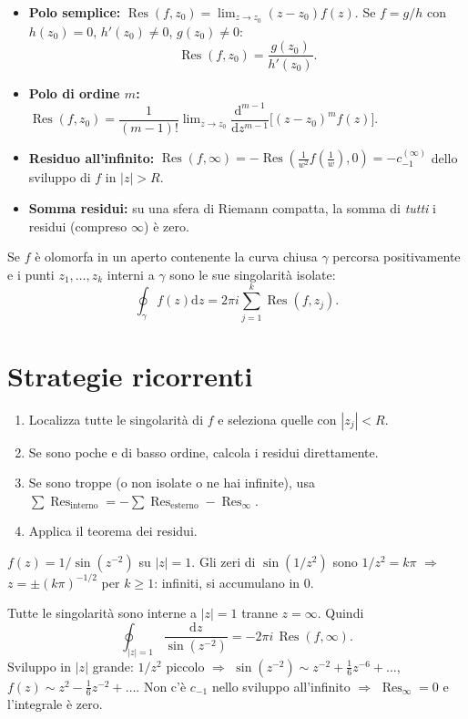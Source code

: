 \documentclass[11pt,a4paper,openany]{book}
\theoremstyle{definition}
\newcommand{\dd}{\mathrm{d}}
\DeclareMathOperator{\Res}{Res}
\begin{document}
\begin{teoria}
\begin{itemize}
\item \textbf{Polo semplice:} $\Res(f,z_0)=\lim_{z\to z_0}(z-z_0)f(z)$. Se $f=g/h$ con $h(z_0)=0$, $h'(z_0)\neq 0$, $g(z_0)\neq 0$:
$$\Res(f,z_0)=\frac{g(z_0)}{h'(z_0)}.$$
\item \textbf{Polo di ordine $m$:} $\Res(f,z_0)=\dfrac{1}{(m-1)!}\lim_{z\to z_0}\dfrac{\dd^{m-1}}{\dd z^{m-1}}\big[(z-z_0)^m f(z)\big]$.
\item \textbf{Residuo all'infinito:} $\Res(f,\infty)=-\Res\!\left(\tfrac{1}{w^2}f(\tfrac 1 w),0\right)=-c_{-1}^{(\infty)}$ dello sviluppo di $f$ in $|z|>R$.
\item \textbf{Somma residui:} su una sfera di Riemann compatta, la somma di \emph{tutti} i residui (compreso $\infty$) \`e zero.
\end{itemize}
\end{teoria}

\begin{teoria}
Se $f$ \`e olomorfa in un aperto contenente la curva chiusa $\gamma$ percorsa positivamente e i punti $z_1,\dots,z_k$ interni a $\gamma$ sono le sue singolarit\`a isolate:
$$\oint_\gamma f(z)\dd z=2\pi i\sum_{j=1}^k\Res(f,z_j).$$
\end{teoria}

\section{Strategie ricorrenti}

\begin{algoritmo}[Integrale su cerchio $|z|=R$]
\begin{enumerate}
\item Localizza tutte le singolarit\`a di $f$ e seleziona quelle con $|z_j|<R$.
\item Se sono poche e di basso ordine, calcola i residui direttamente.
\item Se sono troppe (o non isolate o ne hai infinite), usa $\sum\Res_{\text{interno}}=-\sum\Res_{\text{esterno}}-\Res_\infty$.
\item Applica il teorema dei residui.
\end{enumerate}
\end{algoritmo}

\begin{esempio}[Scritto 08/09/2024, Es. 1]
$f(z)=1/\sin(z^{-2})$ su $|z|=1$. Gli zeri di $\sin(1/z^2)$ sono $1/z^2=k\pi$ $\Rightarrow$ $z=\pm(k\pi)^{-1/2}$ per $k\ge 1$: infiniti, si accumulano in $0$.

Tutte le singolarit\`a sono interne a $|z|=1$ tranne $z=\infty$. Quindi
$$\oint_{|z|=1}\frac{\dd z}{\sin(z^{-2})}=-2\pi i\,\Res(f,\infty).$$
Sviluppo in $|z|$ grande: $1/z^2$ piccolo $\Rightarrow$ $\sin(z^{-2})\sim z^{-2}+\tfrac{1}{6}z^{-6}+\dots$, $f(z)\sim z^2-\tfrac{1}{6}z^{-2}+\dots$. Non c'\`e $c_{-1}$ nello sviluppo all'infinito $\Rightarrow$ $\Res_\infty=0$ e l'integrale \`e zero.
\end{esempio}
\end{document}
